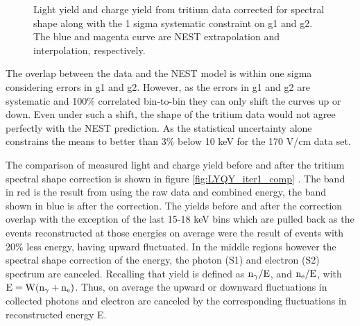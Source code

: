 \begin{figure}[p!]
\caption{Light yield and charge yield from tritium data corrected for spectral shape along with the 1 sigma systematic constraint on g1 and g2. The blue and magenta curve are NEST extrapolation and interpolation, respectively.}
\label{fig:LYQY_iter1}
\end{figure}
\renewcommand{\baselinestretch}{2}
\small\normalsize


The overlap between the data and the NEST model is within one sigma considering errors in g1 and g2. However, as the errors in g1 and g2 are systematic and 100\% correlated bin-to-bin they can only shift the curves up or down. Even under such a shift, the shape of the tritium data would not agree perfectly with the NEST prediction. As the statistical uncertainty alone constrains the means to better than 3\% below 10 keV for the 170 V/cm data set. 

\newpage
The comparison of measured light and charge yield before and after the tritium spectral shape correction is shown in figure \ref{fig:LYQY_iter1_comp} . The band in red is the result from using the raw data and combined energy, the band shown in blue is after the correction. The yields before and after the correction overlap with the exception of the last 15-18 keV bins which are pulled back as the events reconstructed at those energies on average were the result of events with 20\% less energy, having upward fluctuated. In the middle regions however the spectral shape correction of the energy, the photon (S1) and electron (S2) spectrum are canceled. Recalling that yield is defined as $\rm n_\gamma/E $, and $\rm n_e/E$, with $\rm E=W(n_\gamma + n_e)$. Thus, on average the upward or downward fluctuations in collected photons and electron are canceled by the corresponding fluctuations in reconstructed energy E.

